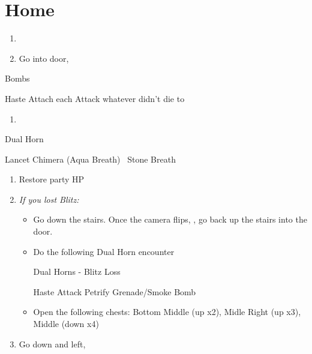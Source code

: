 \chapter{Home}

\begin{enumerate}
  \item \formation{\tidus}{\auron}{\lulu}
  \item Go into door, \sd
\end{enumerate}
\begin{battle}{Bombs}
  \begin{itemize}
    \tidusf Haste \tidus
    \tidusf Attach each
    \auronf Attack whatever didn't die to \tidus
  \end{itemize}
\end{battle}
\begin{enumerate}[resume]
  \item \sd
\end{enumerate}
\begin{battle}{Dual Horn}
  \begin{itemize}
    \kimahrif Lancet Chimera (Aqua Breath)
    \kimahrif \od\ Stone Breath
  \end{itemize}
\end{battle}
\begin{enumerate}[resume]
  \item Restore party HP
  \item \textit{If you lost Blitz:}
        \begin{itemize}
          \item Go down the stairs. Once the camera flips, \formation{\tidus}{\auron}{\rikku}, go back up the stairs into the door.
          \item Do the following Dual Horn encounter

                \begin{battle}{Dual Horns - Blitz Loss}
                  \begin{itemize}
                    \tidusf Haste \tidus
                    \tidusf Attack
                    \rikkuf Petrify Grenade/Smoke Bomb
                  \end{itemize}
                \end{battle}
          \item Open the following chests: Bottom Middle (up x2), Midle Right (up x3), Middle (down x4) %
        \end{itemize}
  \item Go down and left, \cs[0:50]
\end{enumerate}
